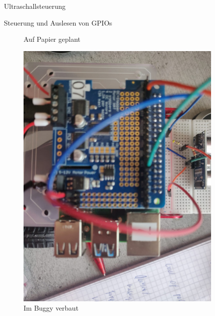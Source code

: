 \documentclass[12pt]{report}
\begin{document}
\begin{section}{Ultraschallsteuerung}
\begin{subsection}{Steuerung und Auslesen von GPIOs}
\begin{figure}[H]
\begin{minipage}{0.45\textwidth}
                \caption{Auf Papier geplant}
            \end{minipage}
            \centering
            \begin{minipage}{0.45\textwidth}
                \centering
                \includegraphics[width=0.9\textwidth]{lernportfolio_assets/Schaltplan_Ultraschallsensor2} 
                \caption{Im Buggy verbaut}
            \end{minipage}
        \end{figure}

    \end{subsection}


\end{section}
\end{document}
